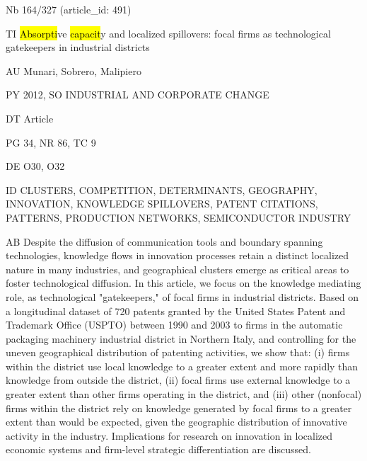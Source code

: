 \documentclass[a4paper]{article}
\begin{document}
\vspace*{-2cm}
Nb \tabto{0cm}164/327 (article\_id: 491)\par
TI \tabto{0cm}\hl{Absorpti}ve \hl{capacit}y and localized spillovers: focal firms as technological gatekeepers in industrial districts\par
AU \tabto{0cm}Munari, Sobrero, Malipiero\par
PY \tabto{0cm}2012, SO INDUSTRIAL AND CORPORATE CHANGE\par
DT \tabto{0cm}Article\par
PG \tabto{0cm}34, NR 86, TC 9\par
DE \tabto{0cm}O30, O32\par
ID \tabto{0cm}CLUSTERS, COMPETITION, DETERMINANTS, GEOGRAPHY, INNOVATION, KNOWLEDGE SPILLOVERS, PATENT CITATIONS, PATTERNS, PRODUCTION NETWORKS, SEMICONDUCTOR INDUSTRY\par
AB \tabto{0cm}Despite the diffusion of communication tools and boundary spanning technologies, knowledge flows in innovation processes retain a distinct localized nature in many industries, and geographical clusters emerge as critical areas to foster technological diffusion. In this article, we focus on the knowledge mediating role, as technological "gatekeepers," of focal firms in industrial districts. Based on a longitudinal dataset of 720 patents granted by the United States Patent and Trademark Office (USPTO) between 1990 and 2003 to firms in the automatic packaging machinery industrial district in Northern Italy, and controlling for the uneven geographical distribution of patenting activities, we show that: (i) firms within the district use local knowledge to a greater extent and more rapidly than knowledge from outside the district, (ii) focal firms use external knowledge to a greater extent than other firms operating in the district, and (iii) other (nonfocal) firms within the district rely on knowledge generated by focal firms to a greater extent than would be expected, given the geographic distribution of innovative activity in the industry. Implications for research on innovation in localized economic systems and firm-level strategic differentiation are discussed.\par
\clearpage
\end{document}
